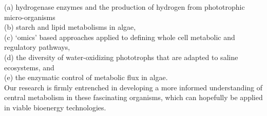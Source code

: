 \documentclass[11pt,a4paper,sans]{moderncv}
\begin{document}
(a) hydrogenase enzymes and the production of hydrogen from phototrophic micro-organisms\\
(b) starch and lipid metabolisms in algae, \\
(c) ‘omics’ based approaches applied to defining whole cell metabolic and regulatory pathways, \\
(d) the diversity of water-oxidizing phototrophs that are adapted to saline ecosystems, and \\
(e) the enzymatic control of metabolic flux in algae. \\
Our research is firmly entrenched in developing a more informed understanding of central metabolism in these fascinating organisms, which can hopefully be applied in viable bioenergy technologies.\\
\end{document}
